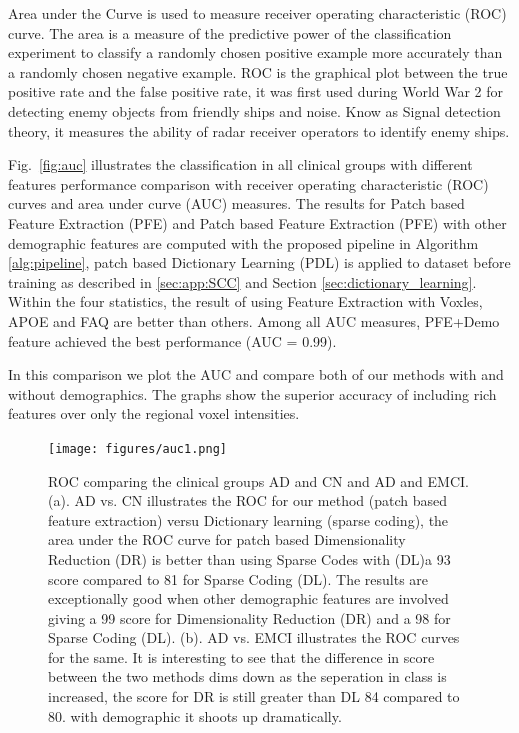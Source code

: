 \documentclass[authoryear,preprint,revi	ew,12pt]{elsarticle}
\newcommand{\Sec}[1]  {Section \ref{sec:#1}}
\begin{document}
Area under the Curve is used to measure receiver operating characteristic (ROC) curve. The area is a measure of the predictive power of the classification experiment to classify a  randomly chosen positive example more accurately than a randomly chosen negative example. ROC is the graphical plot between the true positive rate and the false positive rate, it was first used during World War 2 for detecting enemy objects from friendly ships and noise. Know as Signal detection theory, it measures the ability of radar receiver operators to identify enemy ships.

Fig.~\ref{fig:auc} illustrates the classification in all clinical groups with different features performance comparison with receiver operating characteristic (ROC) curves and area under curve (AUC) measures. The results for Patch based Feature Extraction (PFE) and Patch based Feature Extraction (PFE)  with other demographic features are computed with the proposed pipeline in Algorithm \ref{alg:pipeline}, patch based Dictionary Learning (PDL) is applied to dataset before training as described in \ref{sec:app:SCC} and \Sec{dictionary_learning}. Within the four statistics, the result of using Feature Extraction with Voxles, APOE and FAQ are better than others. Among all AUC measures, PFE+Demo feature achieved the best performance (AUC = 0.99).
	
In this comparison we plot the AUC and compare both of our methods with and without demographics. The graphs show the superior accuracy of including rich features over only the regional voxel intensities. 
\begin{figure}
	\centering
	\texttt{[image: figures/auc1.png]}
	\caption{ROC comparing the clinical groups AD and CN and AD and EMCI. (a). AD vs. CN illustrates the ROC for our method (patch based feature extraction) versu Dictionary learning (sparse coding), the area under the ROC curve for patch based Dimensionality Reduction (DR) is better than using Sparse Codes with  (DL)a 93 score compared to 81 for Sparse Coding (DL). The results are exceptionally good when other demographic features are involved giving a 99 score for Dimensionality Reduction (DR) and a 98 for Sparse Coding (DL). (b). AD vs. EMCI illustrates the ROC curves for the same. It is interesting to see that the difference in score between the two methods dims down as the seperation in class is increased, the score for DR is still greater than DL 84 compared to 80. with demographic it shoots up dramatically.}
	\label{fig:auc1}
\end{figure}
\end{document}
